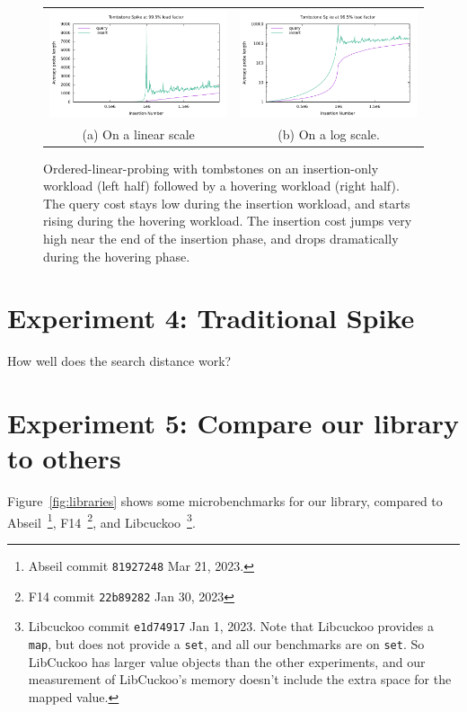 \documentclass[10pt]{article}
\theoremstyle{remark}
\theoremstyle{remark}
\newcommand{\figref}[1]{Figure~\ref{fig:#1}}
\newcommand{\figlabel}[1]{\label{fig:#1}}
\begin{document}
\begin{figure}
\begin{center}
\begin{tabular}{cc}
  \includegraphics[width=75mm]{experiments/spike-1000000-0.995000} &
  \includegraphics[width=75mm]{experiments/spike-1000000-0.995000-log} \\
  (a) On a linear scale & (b) On a log scale.
\end{tabular}
\end{center}
\caption{Ordered-linear-probing with tombstones on an insertion-only
  workload (left half) followed by a hovering workload (right half).
  The query cost stays low during the insertion workload, and starts
  rising during the hovering workload.  The insertion cost jumps very
  high near the end of the insertion phase, and drops dramatically
  during the hovering phase.}
\figlabel{olpspike}
\end{figure}

\section{Experiment 4: Traditional Spike}

How well does the search distance work?

\section{Experiment 5: Compare our library to others}

\figref{libraries} shows some microbenchmarks for our library,
compared to Abseil~\cite{Abseil17}\footnote{Abseil commit
\texttt{81927248} Mar 21, 2023.}, F14~\cite{BronsonSh19}\footnote{F14
commit \texttt{22b89282} Jan 30, 2023}, and Libcuckoo~\cite{LiAnKa14,
  GoyalFaLi23}\footnote{Libcuckoo commit \texttt{e1d74917} Jan 1,
2023.  Note that Libcuckoo provides a \texttt{map}, but does not
provide a \texttt{set}, and all our benchmarks are on \texttt{set}.
So LibCuckoo has larger value objects than the other experiments, and
our measurement of LibCuckoo's memory doesn't include the extra space
for the mapped value.}.
\end{document}
